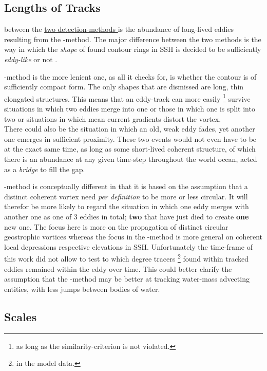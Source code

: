 \subsection{Lengths of Tracks}
 between the \href{box:MI}{two detection-methods } is the abundance of long-lived eddies resulting from the \MI-method. The major difference between the two methods is the way in which the \textit{shape} of found contour rings in SSH is decided to be sufficiently \textit{eddy-like} or not .

 \MI-method is the more lenient one, as all it checks for, is whether the contour is of sufficiently compact form. The only shapes that are dismissed are long, thin elongated structures. This means that \eg an eddy-track can more easily \footnote{as long as the similarity-criterion is not violated.} survive situations in which two eddies merge into one or those in which one is split into two or situations in which mean current gradients distort the vortex.\\ There could also be the situation in which an old, weak eddy fades, yet another one emerges in sufficient proximity. These two events would not even have to be at the exact same time, as long as some short-lived coherent structure, of which there is an abundance at any given time-step throughout the world ocean, acted as a \textit{bridge} to fill the gap.

 \MII-method is conceptually different in that it is based on the assumption that a distinct coherent vortex need \textit{per definition} to be more or less circular. It will therefor be more likely to regard \eg the situation in which one eddy merges with another one as one of 3 eddies in total; \textbf{two} that have just died to create \textbf{one} new one.
The focus here is more on the propagation of distinct circular geostrophic vortices whereas the focus in the \MI-method is more general on coherent local depressions respective elevations in SSH. Unfortunately the time-frame of this work did not allow to test to which degree tracers \footnote{in the model data.} found within tracked eddies remained within the eddy over time. This could better clarify the assumption that the \MI-method may be better at tracking water-mass advecting entities, with less jumps between bodies of water.

\subsection{Scales}

